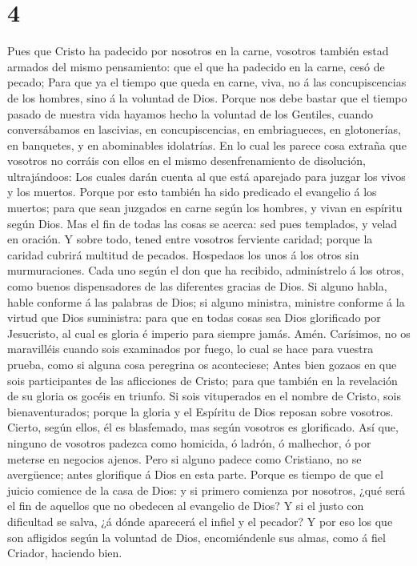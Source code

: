 \hypertarget{section-3}{%
\section{4}\label{section-3}}

 Pues que Cristo ha padecido por nosotros en la carne,
vosotros también estad armados del mismo pensamiento: que el que ha
padecido en la carne, cesó de pecado;  Para que ya el
tiempo que queda en carne, viva, no á las concupiscencias de los
hombres, sino á la voluntad de Dios.  Porque nos debe
bastar que el tiempo pasado de nuestra vida hayamos hecho la voluntad de
los Gentiles, cuando conversábamos en lascivias, en concupiscencias, en
embriagueces, en glotonerías, en banquetes, y en abominables idolatrías.
 En lo cual les parece cosa extraña que vosotros no
corráis con ellos en el mismo desenfrenamiento de disolución,
ultrajándoos:  Los cuales darán cuenta al que está
aparejado para juzgar los vivos y los muertos.  Porque por
esto también ha sido predicado el evangelio á los muertos; para que sean
juzgados en carne según los hombres, y vivan en espíritu según Dios.
 Mas el fin de todas las cosas se acerca: sed pues
templados, y velad en oración.  Y sobre todo, tened entre
vosotros ferviente caridad; porque la caridad cubrirá multitud de
pecados.  Hospedaos los unos á los otros sin
murmuraciones.  Cada uno según el don que ha recibido,
adminístrelo á los otros, como buenos dispensadores de las diferentes
gracias de Dios.  Si alguno habla, hable conforme á las
palabras de Dios; si alguno ministra, ministre conforme á la virtud que
Dios suministra: para que en todas cosas sea Dios glorificado por
Jesucristo, al cual es gloria é imperio para siempre jamás. Amén.
 Carísimos, no os maravilléis cuando sois examinados por
fuego, lo cual se hace para vuestra prueba, como si alguna cosa
peregrina os aconteciese;  Antes bien gozaos en que sois
participantes de las aflicciones de Cristo; para que también en la
revelación de su gloria os gocéis en triunfo.  Si sois
vituperados en el nombre de Cristo, sois bienaventurados; porque la
gloria y el Espíritu de Dios reposan sobre vosotros. Cierto, según
ellos, él es blasfemado, mas según vosotros es glorificado.
 Así que, ninguno de vosotros padezca como homicida, ó
ladrón, ó malhechor, ó por meterse en negocios ajenos. 
Pero si alguno padece como Cristiano, no se avergüence; antes glorifique
á Dios en esta parte.  Porque es tiempo de que el juicio
comience de la casa de Dios: y si primero comienza por nosotros, ¿qué
será el fin de aquellos que no obedecen al evangelio de Dios?
 Y si el justo con dificultad se salva, ¿á dónde
aparecerá el infiel y el pecador?  Y por eso los que son
afligidos según la voluntad de Dios, encomiéndenle sus almas, como á
fiel Criador, haciendo bien.


